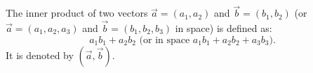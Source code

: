 \begin{definition}
    The inner product of two vectors $ \vec{a} = (a_1,a_2) $ and $ \vec{b} = (b_1,b_2) $
    (or $ \vec{a} = (a_1,a_2,a_3) $ and $ \vec{b} = (b_1,b_2,b_3) $ in space) is defined as:
    $$ a_1b_1 + a_2b_2 \text{ (or in space $a_1b_1+a_2b_2+a_3b_3$).}$$
    It is denoted by $ (\vec{a}, \vec{b}) $.
\end{definition}